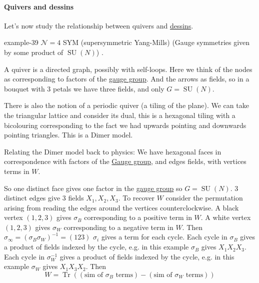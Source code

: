 \documentclass[10pt,]{book}
\numberwithin{equation}{section}
\newcommand{\inv}{^{-1}}
\DeclareMathOperator{\trace}{Tr}
\DeclareMathOperator{\specialunitary}{SU}
\begin{document}
\paragraph[{Quivers and dessins}]{Quivers and dessins}\hypertarget{paragraphs-21}{}
\hypertarget{p-772}{}%
Let's now study the relationship between quivers and \hyperref[def-dessin-denfant]{dessins}.%
\begin{example}{}{example-39}%
\hypertarget{p-773}{}%
\(\mathcal N = 4\) SYM (supersymmetric Yang-Mills) (Gauge symmetries given by some product of \(\specialunitary (N)\)) .%
\end{example}
\hypertarget{p-774}{}%
A quiver is a directed graph, possibly with self-loops. Here we think of the nodes as corresponding to factors of the \hyperref[def-gauge-transformations]{gauge group}. And the arrows as fields, so in a bouquet with 3 petals we have three fields, and only \(G = \specialunitary (N)\).%
\par
\hypertarget{p-775}{}%
There is also the notion of a periodic quiver (a tiling of the plane). We can take the triangular lattice and consider its dual, this is a hexagonal tiling with a bicolouring corresponding to the fact we had upwards pointing and downwards pointing triangles. This is a Dimer model.%
\par
\hypertarget{p-776}{}%
Relating the Dimer model back to physics: We have hexagonal faces in correspondence with factors of the \hyperref[def-gauge-transformations]{Gauge group}, and edges fields, with vertices terms in \(W\).%
\par
\hypertarget{p-777}{}%
So one distinct face gives one factor in the \hyperref[def-gauge-transformations]{gauge group} so \(G = \specialunitary (N)\). 3 distinct edges give 3 fields \(X_1, X_2, X_3\). To recover \(W\) consider the permutation arising from reading the edges around the vertices counterclockwise. A black vertex \((1,2,3)\) gives \(\sigma_B\) corresponding to a positive term in \(W\). A white vertex \((1,2,3)\) gives \(\sigma_W\) corresponding to a negative term in \(W\). Then \(\sigma_\infty = (\sigma_B\sigma_W)\inv = (123)\) \(\sigma_i\) gives a term for each cycle. Each cycle in \(\sigma_B\) gives a product of fields indexed by the cycle, e.g. in this example \(\sigma_B\) gives \(X_1X_2X_3\). Each cycle in \(\sigma_W\inv\) gives a product of fields indexed by the cycle, e.g. in this example \(\sigma_W\) gives \(X_1X_3X_2\). Then%
\begin{equation*}
W = \trace((\text{sim of }\sigma_B\text{ terms}) - (\text{sim of }\sigma_W\text{ terms}))
\end{equation*}
\end{document}
